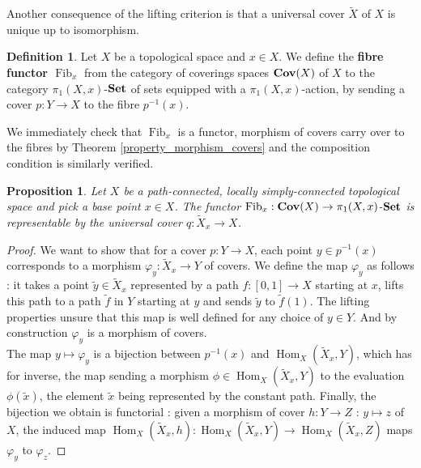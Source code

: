 \documentclass{article}
\theoremstyle{plain}
\newtheorem{proposition}[theorem]{Proposition}
\theoremstyle{definition}
\newtheorem{definition}[theorem]{Definition}
\DeclareMathOperator{\Hom}{Hom}
\DeclareMathOperator{\Fib}{Fib}
\DeclareMathOperator{\SET}{\bf{Set}}
\DeclareMathOperator{\Cov}{\bf{Cov}}
\begin{document}
\noindent Another consequence of the lifting criterion is that a universal cover $\widetilde{X}$ of $X$ is unique up to isomorphism.
    

\begin{definition}
    Let $X$ be a topological space and $x\in X$. We define the \textbf{fibre functor $\Fib_x$} from the category of coverings spaces $\Cov(X)$ of $X$ to the category $\pi_1(X,x)$-$\SET$ of sets equipped with a $\pi_1(X,x)$-action, by sending a cover $p:Y\rightarrow X$ to the fibre $p^{-1}(x)$.
\end{definition}

\noindent We immediately check that $\Fib_x$ is a functor, morphism of covers carry over to the fibres by Theorem \ref{property_morphism_covers} and the composition condition is similarly verified.

\begin{proposition}
\label{representable_fibre_functor}
    Let $X$ be a path-connected, locally simply-connected topological space and pick a base point $x\in X$. 
    The functor $\Fib_x :\Cov(X) \rightarrow \pi_1(X,x)$-$\SET$ is representable by the universal cover $q:\widetilde{X}_x\rightarrow X$.
\end{proposition}
\begin{proof}
    We want to show that for a cover $p:Y\rightarrow X$, each point $y\in p^{-1}(x)$ corresponds to a morphism $\varphi_y :\widetilde{X}_x\rightarrow Y$ of covers.
    We define the map $\varphi_y$ as follows : it takes a point $\widetilde{y}\in \widetilde{X}_x$ represented by a path $f:[0,1]\rightarrow X$ starting at $x$, lifts this path to a path $\widetilde{f}$ in $Y$ starting at $y$ and sends  $\widetilde{y}$ to $\widetilde{f}(1)$.
    The lifting properties unsure that this map is well defined for any choice of $y\in Y$. And by construction $\varphi_y$ is a morphism of covers. \\
    The map  $y\mapsto\varphi_y$ is a bijection between $p^{-1}(x)$ and $\Hom_X(\widetilde{X}_x,Y)$, which has for inverse, the map sending a morphism $\phi \in \Hom_X(\widetilde{X}_x,Y)$ to the evaluation $\phi(\widetilde{x})$, the element $\widetilde{x}$ being represented by the constant path.
    Finally, the bijection we obtain is functorial : given a morphism of cover $h: Y\rightarrow Z$ : $y\mapsto z$ of $X$, the induced map $\Hom_X(\widetilde{X}_x, h): \Hom_X(\widetilde{X}_x,Y)\rightarrow \Hom_X(\widetilde{X}_x,Z)$ maps $\varphi_y$ to $\varphi_z$.
\end{proof}
\end{document}
